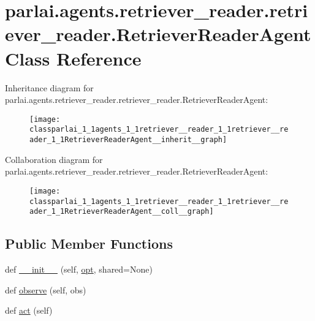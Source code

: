 \hypertarget{classparlai_1_1agents_1_1retriever__reader_1_1retriever__reader_1_1RetrieverReaderAgent}{}\section{parlai.\+agents.\+retriever\+\_\+reader.\+retriever\+\_\+reader.\+Retriever\+Reader\+Agent Class Reference}
\label{classparlai_1_1agents_1_1retriever__reader_1_1retriever__reader_1_1RetrieverReaderAgent}


Inheritance diagram for parlai.\+agents.\+retriever\+\_\+reader.\+retriever\+\_\+reader.\+Retriever\+Reader\+Agent\+:
\nopagebreak
\begin{figure}[H]
\begin{center}
\leavevmode
\texttt{[image: classparlai\_1\_1agents\_1\_1retriever\_\_reader\_1\_1retriever\_\_reader\_1\_1RetrieverReaderAgent\_\_inherit\_\_graph]}
\end{center}
\end{figure}


Collaboration diagram for parlai.\+agents.\+retriever\+\_\+reader.\+retriever\+\_\+reader.\+Retriever\+Reader\+Agent\+:
\nopagebreak
\begin{figure}[H]
\begin{center}
\leavevmode
\texttt{[image: classparlai\_1\_1agents\_1\_1retriever\_\_reader\_1\_1retriever\_\_reader\_1\_1RetrieverReaderAgent\_\_coll\_\_graph]}
\end{center}
\end{figure}
\subsection*{Public Member Functions}
\begin{DoxyCompactItemize}
\item 
def \hyperlink{classparlai_1_1agents_1_1retriever__reader_1_1retriever__reader_1_1RetrieverReaderAgent_a7777973d732eccc4a630116d8a9462f1}{\+\_\+\+\_\+init\+\_\+\+\_\+} (self, \hyperlink{classparlai_1_1core_1_1agents_1_1Agent_ab3b45d2754244608c75d4068b90cd051}{opt}, shared=None)
\item 
def \hyperlink{classparlai_1_1agents_1_1retriever__reader_1_1retriever__reader_1_1RetrieverReaderAgent_a093b0a679a2cc8a09ed3a4ae314362b1}{observe} (self, obs)
\item 
def \hyperlink{classparlai_1_1agents_1_1retriever__reader_1_1retriever__reader_1_1RetrieverReaderAgent_a26f155f699b7a345b3f995b09e049a97}{act} (self)
\end{DoxyCompactItemize}
